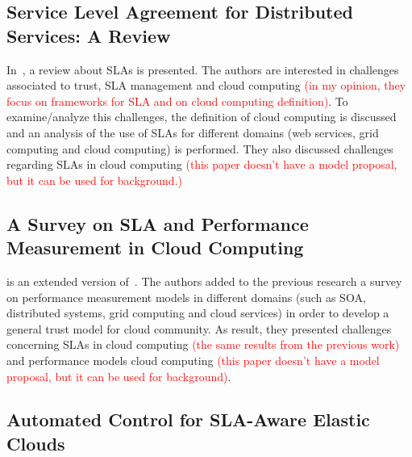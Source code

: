 \documentclass[12pt,a4paper,oneside]{article}
\begin{document}
\subsection{Service Level Agreement for Distributed Services: A Review}

In~\cite{003}, a review about SLAs is presented. The authors are interested in challenges associated to trust, SLA management and cloud computing \textcolor{red}{(in my opinion, they focus on frameworks for SLA and  on cloud computing definition)}. To examine/analyze this challenges, the definition of cloud computing is discussed and an analysis of the use of SLAs for different domains (web services, grid computing and cloud computing) is performed. They also discussed challenges regarding SLAs in cloud computing \textcolor{red}{(this paper doesn't have a model proposal, but it can be used for background.)}

\subsection{A Survey on SLA and Performance Measurement in Cloud Computing}

\cite{004} is an extended version of~\cite{003}. The authors added to the previous research a survey on performance measurement models in different domains (such as SOA, distributed systems, grid computing and cloud services) in order to develop a general trust model for cloud community. As result, they presented challenges concerning SLAs in cloud computing \textcolor{red}{(the same results from the previous work)} and performance models cloud computing \textcolor{red}{(this paper doesn't have a model proposal, but it can be used for background)}.

\subsection{Automated Control for SLA-Aware Elastic Clouds}
\end{document}
